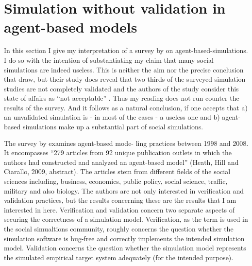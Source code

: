 \documentclass[12pt, english, a4paper]{article}
\begin{document}
\section{Simulation without validation in agent-based models}

In this section I give my interpretation of a survey by
\citet{heath-et-al:2009} on agent-based-simulations. I do so with the
intention of substantiating my claim that many social simulations are
indeed useless. This is neither the aim nor the precise conclusion
that \citet{heath-et-al:2009} draw, but their study does reveal that
two thirds of the surveyed simulation studies are not completely
validated and the authors of the study consider this state of affairs
as ``not acceptable'' \citep[4.11]{heath-et-al:2009}. Thus my reading
does not run counter the results of the survey. And it follows as a
natural conclusion, if one accepts that a) an unvalidated simulation
is - in most of the cases - a useless one and b) agent-based
simulations make up a substantial part of social simulations.

The survey by \citet{heath-et-al:2009} examines agent-based mode- ling
practices between 1998 and 2008. It encompasses “279 articles from 92
unique publication outlets in which the authors had constructed and
analyzed an agent-based model” (Heath, Hill and Ciarallo, 2009,
abstract). The articles stem from different fields of the social
sciences including, business, economics, public policy, social
science, traffic, military and also biology. The authors are not only
interested in verification and validation practices, but the results
concerning these are the results that I am interested in
here. Verification and validation concern two separate aspects of
securing the correctness of a simulation model.  Verification,
as the term is used in the social simualtions community, roughly
concerns the question whether the simulation software is bug-free and
correctly implements the intended simulation model. Validation
concerns the question whether the simulation model represents the
simulated empirical target system adequately (for the intended
purpose).
\end{document}

